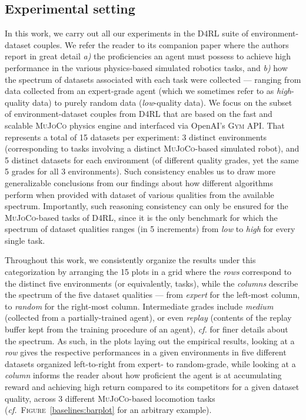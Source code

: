 \subsection{Experimental setting}
\label{experimentalsetting}

In this work, we carry out all our experiments in the D4RL suite of environment-dataset couples.
We refer the reader to its companion paper \cite{Fu2020-ic}
where the authors report in great detail
\textit{a)} the proficiencies an agent must possess to achieve high performance
in the various physics-based simulated robotics tasks, and
\textit{b)} how the spectrum of datasets associated with each task were collected
--- ranging from data collected from an expert-grade agent (which we sometimes refer to as \textit{high}-quality data)
to purely random data (\textit{low}-quality data).
We focus on the subset of environment-dataset couples from D4RL that are based on the
fast and scalable \textsc{MuJoCo} \cite{Todorov2012-gc} physics engine
and interfaced via OpenAI's \textsc{Gym} \cite{Brockman2016-un} API.
That represents a total of 15 datasets per experiment: 3 distinct environments (corresponding to
tasks involving a distinct \textsc{MuJoCo}-based simulated robot), and 5 distinct datasets for each environment
(of different quality grades, yet the same 5 grades for all 3 environments).
Such consistency enables us to draw more generalizable conclusions from our findings about how different
algorithms perform when provided with dataset of various qualities from the available spectrum.
Importantly, such reasoning consistency can only be ensured for the \textsc{MuJoCo}-based tasks of D4RL,
since it is the only benchmark for which the spectrum of dataset qualities ranges
(in 5 increments)
from \textit{low} to \textit{high}
for every single task.

Throughout this work, we consistently organize the results under this categorization
by arranging the 15 plots in a grid where the \textit{rows} correspond to the distinct five
environments (or equivalently, tasks),
while the \textit{columns} describe the spectrum of the five dataset qualities
--- from \textit{expert} for the left-most column, to \textit{random} for the right-most column.
Intermediate grades include \textit{medium} (collected from a partially-trained agent),
or even \textit{replay} (contents of the replay buffer \cite{Lin1993-qe}
kept from the training procedure of an agent), \textit{cf.} \cite{Fu2020-ic}
for finer details about the spectrum.
As such, in the plots laying out the empirical results,
looking at a \textit{row} gives the respective performances in a given environments in five different datasets
organized left-to-right from expert- to random-grade, while looking at a \textit{column} informs the reader about
how proficient the agent is at accumulating reward and achieving high return
compared to its competitors for a given dataset quality,
across 3 different \textsc{MuJoCo}-based locomotion tasks
(\textit{cf.}~\textsc{Figure}~\ref{baselines:barplot} for an arbitrary example).

